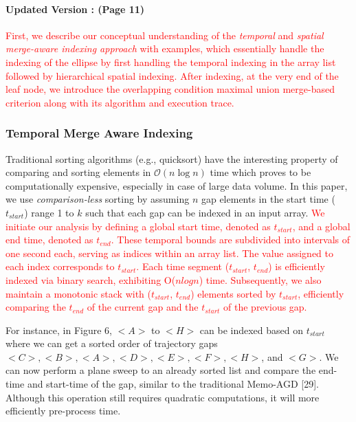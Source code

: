 \documentclass[twoside,leqno,onecolumn]{article}
\begin{document}
\paragraph{Updated Version : (Page 11) \\} \textcolor{red}{First, we describe our conceptual understanding of the \textit{temporal} and \textit{spatial merge-aware indexing approach} with examples, which essentially handle the indexing of the ellipse by first handling the temporal indexing in the array list followed by hierarchical spatial indexing. After indexing, at the very end of the leaf node, we introduce the overlapping condition maximal union merge-based criterion along with its algorithm and execution trace.} %

\subsubsection{Temporal Merge Aware Indexing}
\label{subsubsection:Time based indexing}

Traditional sorting algorithms (e.g., quicksort) have the interesting property of comparing and sorting elements in $\mathcal{O}(n\log{}n)$ time which proves to be computationally expensive, especially in case of large data volume. In this paper, we use \textit{comparison-less} sorting by assuming $n$ gap elements in the start time ($t_{start}$) range 1 to $k$ such that each gap can be indexed in an input array. \textcolor{red}{We initiate our analysis by defining a global start time, denoted as $t_{start}$, and a global end time, denoted as $t_{end}$. These temporal bounds are subdivided into intervals of one second each, serving as indices within an array list. The value assigned to each index corresponds to $t_{start}$. Each time segment ($t_{start}$, $t_{end}$) is efficiently indexed via binary search, exhibiting O($nlogn$) time. Subsequently, we also maintain a monotonic stack with ($t_{start}$, $t_{end}$) elements sorted by $t_{start}$, efficiently comparing the $t_{end}$ of the current gap and the $t_{start}$ of the previous gap.}

For instance, in Figure 6, $<A>$ to $<H>$ can be indexed based on $t_{start}$ where we can get a sorted order of trajectory gaps $<C>,<B>,<A>,<D>,<E>, <F>, <H>$, and $<G>$.  We can now perform a plane sweep to an already sorted list and compare the end-time and start-time of the gap, similar to the traditional Memo-AGD [29]. Although this operation still requires quadratic computations, it will more efficiently pre-process time. 
\end{document}
